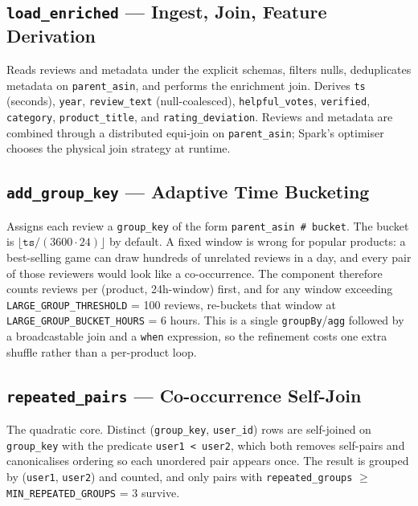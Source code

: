 \documentclass[12pt]{article}
\begin{document}
\subsection{\texttt{load\_enriched} --- Ingest, Join, Feature Derivation}

Reads reviews and metadata under the explicit schemas, filters nulls,
deduplicates metadata on \texttt{parent\_asin}, and performs the enrichment
join. Derives \texttt{ts} (seconds), \texttt{year},
\texttt{review\_text} (null-coalesced), \texttt{helpful\_votes},
\texttt{verified}, \texttt{category}, \texttt{product\_title}, and
\texttt{rating\_deviation}. Reviews and metadata are combined through a
distributed equi-join on \texttt{parent\_asin}; Spark's optimiser chooses the
physical join strategy at runtime.

\subsection{\texttt{add\_group\_key} --- Adaptive Time Bucketing}

Assigns each review a \texttt{group\_key} of the form
\texttt{parent\_asin \# bucket}. The bucket is
$\lfloor \texttt{ts} / (3600 \cdot 24) \rfloor$ by default. A fixed window is
wrong for popular products: a best-selling game can draw hundreds of unrelated
reviews in a day, and every pair of those reviewers would look like a
co-occurrence. The component therefore counts reviews per
(product, 24h-window) first, and for any window exceeding
\texttt{LARGE\_GROUP\_THRESHOLD} = 100 reviews, re-buckets that window at
\texttt{LARGE\_GROUP\_BUCKET\_HOURS} = 6 hours. This is a single
\texttt{groupBy}/\texttt{agg} followed by a broadcastable join and a
\texttt{when} expression, so the refinement costs one extra shuffle rather
than a per-product loop.

\subsection{\texttt{repeated\_pairs} --- Co-occurrence Self-Join}

The quadratic core. Distinct (\texttt{group\_key}, \texttt{user\_id}) rows are
self-joined on \texttt{group\_key} with the predicate
\texttt{user1 < user2}, which both removes self-pairs and canonicalises
ordering so each unordered pair appears once. The result is grouped by
(\texttt{user1}, \texttt{user2}) and counted, and only pairs with
\texttt{repeated\_groups} $\geq$ \texttt{MIN\_REPEATED\_GROUPS} = 3 survive.
\end{document}
